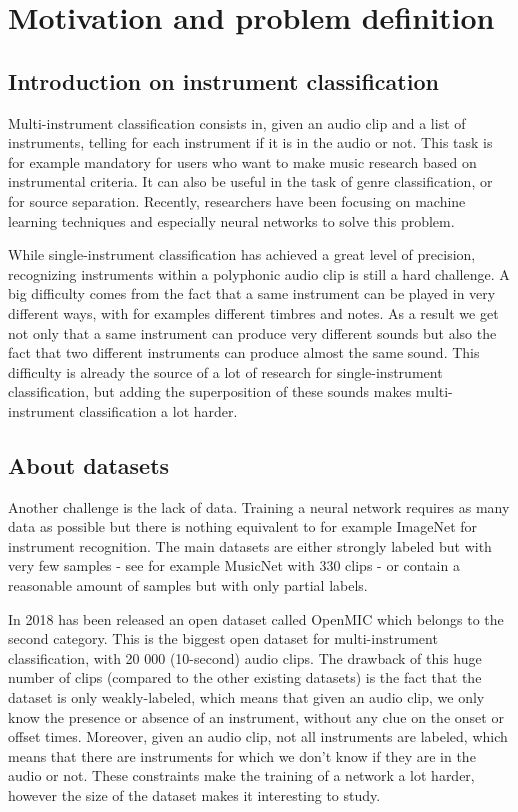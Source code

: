 \documentclass[final]{cvpr}
\begin{document}
\section{Motivation and problem definition}
\subsection{Introduction on instrument classification}
Multi-instrument classification consists in, given an audio clip and a list of instruments, telling for each instrument if it is in the audio or not. This task is for example mandatory for users who want to make music research based on instrumental criteria. It can also be useful in the task of genre classification, or for source separation. Recently, researchers have been focusing on machine learning techniques and especially neural networks to solve this problem.

While single-instrument classification has achieved a great level of precision, recognizing instruments within a polyphonic audio clip is still a hard challenge. A big difficulty comes from the fact that a same instrument can be played in very different ways, with for examples different timbres and notes. As a result we get not only that a same instrument can produce very different sounds but also the fact that two different instruments can produce almost the same sound. This difficulty is already the source of a lot of research for single-instrument classification, but adding the superposition of these sounds makes multi-instrument classification a lot harder.

\subsection{About datasets}

Another challenge is the lack of data. Training a neural network requires as many data as possible but there is nothing equivalent to for example ImageNet for instrument recognition. The main datasets are either strongly labeled but with very few samples - see for example MusicNet \cite{MusicNet} with 330 clips - or contain a reasonable amount of samples but with only partial labels. 

In 2018 has been released an open dataset called OpenMIC \cite{MIC} which belongs to the second category. This is the biggest open dataset for multi-instrument classification, with 20 000 (10-second) audio clips. The drawback of this huge number of clips (compared to the other existing datasets) is the fact that the dataset is only weakly-labeled, which means that given an audio clip, we only know the presence or absence of an instrument, without any clue on the onset or offset times. Moreover, given an audio clip, not all instruments are labeled, which means that there are instruments for which we don't know if they are in the audio or not. These constraints make the training of a network a lot harder, however the size of the dataset makes it interesting to study.
\end{document}
